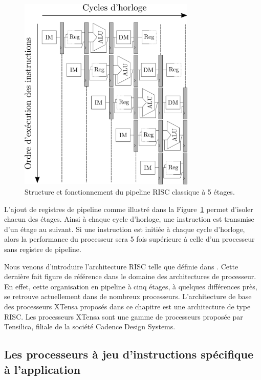 \begin{figure}[t]
\centering
\includegraphics[width=0.75\textwidth]{main/ch3_fig/pipelines}
\caption{Structure et fonctionnement du pipeline RISC classique à 5 étages.}
\label{fig:pipelines}
\end{figure}


L'ajout de registres de pipeline comme illustré dans la Figure~\ref{fig:pipelines} permet d'isoler chacun des étages. Ainsi à chaque cycle d'horloge, une instruction est transmise d'un étage au suivant. Si une instruction est initiée à chaque cycle d'horloge, alors la performance du processeur sera 5 fois supérieure à celle d'un processeur sans registre de pipeline.

Nous venons d'introduire l'architecture RISC telle que définie dans \cite{hennessy2011computer}. Cette dernière fait figure de référence dans le domaine des architectures de processeur. En effet, cette organisation en pipeline à cinq étages, à quelques différences près, se retrouve actuellement dans de nombreux processeurs. L'architecture de base des processeurs XTensa proposés dans ce chapitre est une architecture de type RISC. Les processeurs XTensa sont une gamme de processeurs proposée par Tensilica, filiale de la société Cadence Design Systems.

\subsection{Les processeurs à jeu d'instructions spécifique à l'application}


